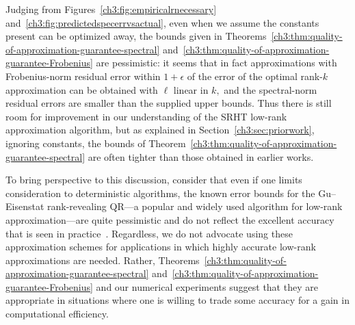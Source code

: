 Judging from Figures~\ref{ch3:fig:empiricalrnecessary} and~\ref{ch3:fig:predictedspecerrvsactual}, even when we
assume the constants present can be optimized away, the bounds given in Theorems~\ref{ch3:thm:quality-of-approximation-guarantee-spectral}
and~\ref{ch3:thm:quality-of-approximation-guarantee-Frobenius}
are pessimistic: it seems that in fact approximations with Frobenius-norm residual error within $1+\epsilon$ of the error of the
optimal rank-$k$ approximation can be obtained with $\ell$ linear in $k,$ and the spectral-norm residual errors are smaller than the supplied upper bounds.
Thus there is still room for improvement in our understanding of the SRHT low-rank approximation algorithm, but as explained in Section~\ref{ch3:sec:priorwork},
ignoring constants, the bounds of Theorem~\ref{ch3:thm:quality-of-approximation-guarantee-spectral} are often tighter than those obtained in earlier works.

To bring perspective to this discussion, consider that even if one limits consideration to deterministic algorithms, the
known error bounds for the Gu--Eisenstat rank-revealing QR---a popular and widely used algorithm for low-rank 
approximation---are quite pessimistic and do not reflect the excellent accuracy that is seen in practice~\cite{GE96}. 
Regardless, we do not advocate using these approximation schemes for applications in which highly accurate low-rank 
approximations are needed. Rather, Theorems~\ref{ch3:thm:quality-of-approximation-guarantee-spectral} 
and~\ref{ch3:thm:quality-of-approximation-guarantee-Frobenius} and our numerical experiments 
suggest that they are appropriate in situations where one is willing to trade some accuracy for a gain in computational efficiency.
